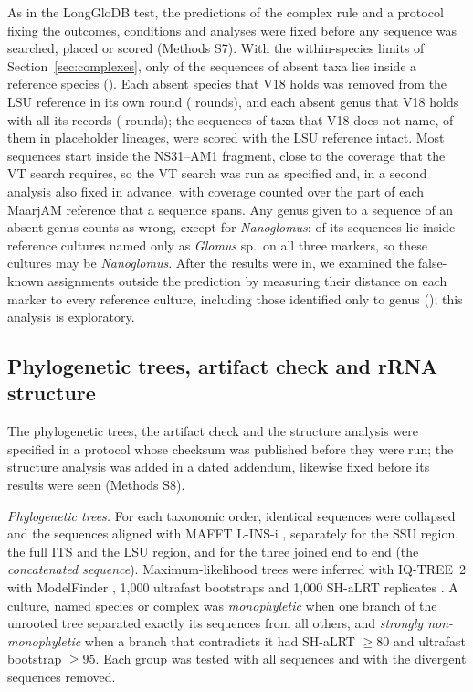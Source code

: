 \documentclass[11pt]{article}
\newcommand{\spn}[1]{\emph{#1}}   %
\begin{document}
As in the LongGloDB test, the predictions of the complex rule and a protocol fixing the outcomes, conditions and
analyses were fixed before any sequence was searched, placed or scored (Methods S7). With the within-species limits
of Section~\ref{sec:complexes}, only \EkLockedN{} of the \EkNovelN{} sequences of absent taxa lies inside a
reference species (\EkLockedCase{}). Each absent species that V18 holds was removed from the LSU reference in its
own round (\EkRoundsSp{} rounds), and each absent genus that V18 holds with all its records (\EkRoundsGen{} rounds);
the \EkApartN{} sequences of taxa that V18 does not name, \EkPlaceholderN{} of them in placeholder lineages, were
scored with the LSU reference intact. Most sequences start \EkVTStart{} inside the NS31--AM1 fragment, close to the
coverage that the VT search requires, so the VT search was run as specified and, in a second analysis also fixed in
advance, with coverage counted over the part of each MaarjAM reference that a sequence spans. Any genus given to a
sequence of an absent genus counts as wrong, except for \spn{Nanoglomus}: \EkNanoInsideN{} of its sequences lie
inside reference cultures named only as \spn{Glomus} sp.\ on all three markers, so these cultures may be
\spn{Nanoglomus}. After the results were in, we examined the false-known assignments outside the prediction by
measuring their distance on each marker to every reference culture, including those identified only to genus
(); this analysis is exploratory.

\subsection{Phylogenetic trees, artifact check and rRNA structure}\label{sec:checkmethods}
The phylogenetic trees, the artifact check and the structure analysis were specified in a protocol whose checksum
was published before they were run; the structure analysis was added in a dated addendum, likewise fixed before its results were seen (Methods S8).

\emph{Phylogenetic trees.} For each taxonomic order, identical sequences were collapsed and the sequences aligned
with MAFFT L-INS-i \cite{katoh2013mafft}, separately for the SSU region, the full ITS and the LSU region, and for
the three joined end to end (the \emph{concatenated sequence}). Maximum-likelihood trees were inferred with
IQ-TREE~2 \cite{minh2020iqtree} with ModelFinder \cite{kalyaanamoorthy2017modelfinder}, 1,000 ultrafast bootstraps
\cite{hoang2018ufboot} and 1,000 SH-aLRT replicates \cite{guindon2010phyml}. A culture, named species or complex was
\emph{monophyletic} when one branch of the unrooted tree separated exactly its sequences from all others, and
\emph{strongly non-monophyletic} when a branch that contradicts it had SH-aLRT $\ge80$ and ultrafast bootstrap
$\ge95$. Each group was tested with all sequences and with the divergent sequences removed.
\end{document}
